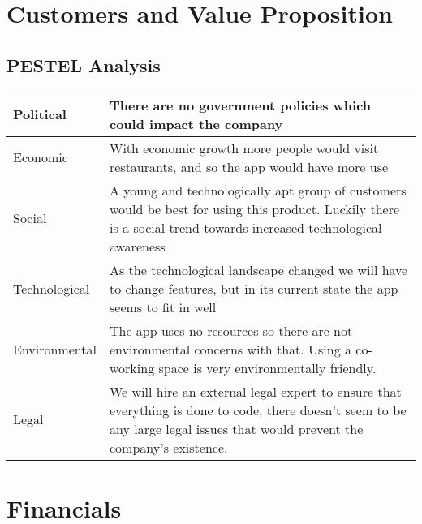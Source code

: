 \documentclass{article}[18pt]
\begin{document}
\begin{appendices}
\section{Customers and Value Proposition}
\subsection{PESTEL Analysis}
\label{appendix:PESTEL}
\begin{center}
{\renewcommand{\arraystretch}{2}
\begin{tabular}{| m{0.2\linewidth} |m{0.8\linewidth}|}
\hline
Political& There are no government policies which could impact the company\\
\hline
Economic&With economic growth more people would visit restaurants, and so the app would have more use\\
\hline
Social&	A young and technologically apt group of customers would be best for using this product. Luckily there is a social trend towards increased technological awareness\\
\hline
Technological&	As the technological landscape changed we will have to change features, but in its current state the app seems to fit in well\\
\hline
Environmental&The app uses no resources so there are not environmental concerns with that. Using a co-working space is very environmentally friendly.\\
\hline
Legal&We will hire an external legal expert to ensure that everything is done to code, there doesn't seem to be any large legal issues that would prevent the company's existence.\\
\hline
\end{tabular}}
\end{center}

\section{Financials}
\label{appendix:Financials}

\end{appendices}
\end{document}
